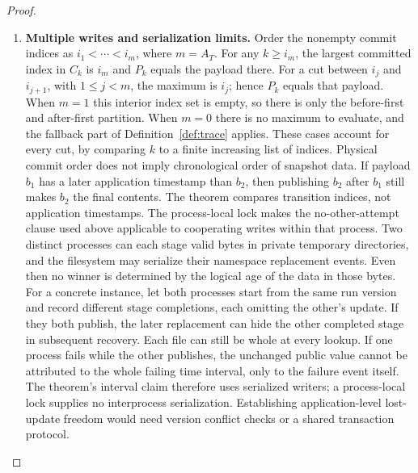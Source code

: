 \documentclass[12pt]{article}
\begin{document}
\begin{proof}
\begin{enumerate}
\item \textbf{Multiple writes and serialization limits.}
Order the nonempty commit indices as $i_1<\cdots<i_m$,
where $m=A_T$. For any $k\geq i_m$, the largest committed
index in $C_k$ is $i_m$ and $P_k$ equals the payload there.
For a cut between $i_j$ and $i_{j+1}$, with $1\leq j<m$,
the maximum is $i_j$; hence $P_k$ equals that payload.
When $m=1$ this interior index set is empty, so there is
only the before-first and after-first partition.
When $m=0$ there is no maximum to evaluate,
and the fallback part of Definition~\ref{def:trace} applies.
These cases account for every cut, by comparing $k$
to a finite increasing list of indices.
Physical commit order does not imply chronological order of
snapshot data. If payload $b_1$ has a later application timestamp
than $b_2$, then publishing $b_2$ after $b_1$ still makes
$b_2$ the final contents. The theorem compares transition
indices, not application timestamps.
The process-local lock makes the no-other-attempt clause used
above applicable to cooperating writes within that process.
Two distinct processes can each stage valid bytes in private
temporary directories, and the filesystem may serialize their
namespace replacement events.
Even then no winner is determined by the logical age of the
data in those bytes. For a concrete instance, let both
processes start from the same run version and record different
stage completions, each omitting the other's update.
If they both publish, the later replacement can hide the other
completed stage in subsequent recovery.
Each file can still be whole at every lookup.
If one process fails while the other publishes, the unchanged
public value cannot be attributed to the whole failing time
interval, only to the failure event itself.
The theorem's interval claim therefore uses serialized writers;
a process-local lock supplies no interprocess serialization.
Establishing application-level lost-update freedom would need
version conflict checks or a shared transaction protocol.


\end{enumerate}
\end{proof}
\end{document}
